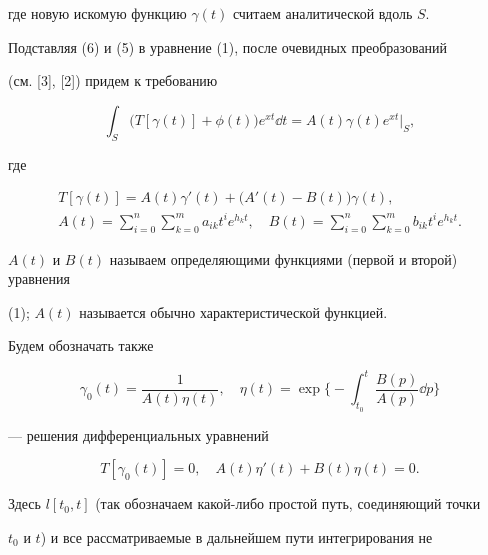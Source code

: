 где новую искомую функцию $\gamma(t)$ считаем аналитической вдоль $S$.


Подставляя (6) и (5) в уравнение (1), после очевидных преобразований


(см. [3], [2]) придем к требованию


\begin{equation}


\int_{S}{\Big( T[\gamma(t)]+\phi(t) \Big) e^{xt} \dd t}=


A(t)\gamma(t)e^{xt}\big|_{S},


\end{equation}


где


\begin{gather*}


T[\gamma(t)]=A(t)\gamma'(t)+\big( A'(t)-B(t) \big)\gamma(t),\\


%


A(t)=\sum_{i=0}^{n} {\sum_{k=0}^{m}{a_{ik}t^{i}e^{h_{k}t}} },


\quad B(t)=\sum_{i=0}^{n} {\sum_{k=0}^{m}{b_{ik}t^{i}e^{h_{k}t}} }.


\end{gather*}


$A(t)$ и $B(t)$ называем определяющими функциями (первой и второй) уравнения


(1); $A(t)$ называется обычно характеристической функцией.





Будем обозначать также


\begin{equation}


\gamma_{0}(t)=\frac{1}{A(t)\eta(t)},


\quad \eta(t)=\exp{ \bigg\{ -\int_{t_{0}}^{t}{\frac{B(p)}{A(p)}}\dd p


\bigg\} }


\end{equation}


--- решения дифференциальных уравнений


$$


T[\gamma_0(t)]=0,\quad A(t)\eta'(t)+B(t)\eta(t)=0.


$$


Здесь $l[t_0,t]$ (так обозначаем какой-либо простой путь, соединяющий точки


$t_0$ и $t$) и все рассматриваемые в дальнейшем пути интегрирования не


